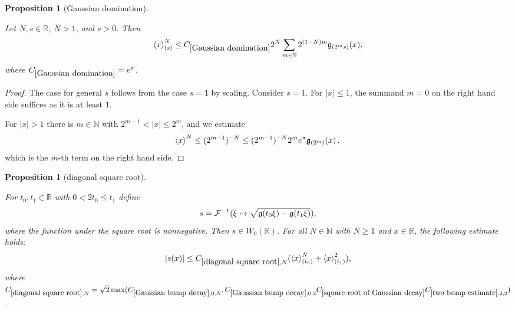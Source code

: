 \documentclass[12pt,reqno]{amsart}
\theoremstyle{plain}
\newtheorem{proposition}[theorem]{Proposition}
\numberwithin{equation}{section}
\theoremstyle{remark}
\newcommand{\uses}[1]{}
\newcommand{\usesdefs}[1]{}
\newcommand{\leanok}{}
\newcommand{\lean}[1]{}
\newcommand{\R}{{\mathbb R}}
\newcommand{\N}{{\mathbb N}}
\begin{document}
\begin{proposition}[Gaussian domination]\label{Gaussian domination}\uses{}\usesdefs{gaussian,bracket bump}
\lean{Auto.gaussianDomination}
\leanok
    Let
    $N,s\in\R$, $N>1$, and $s>0$. Then
\begin{equation}\label{auto:bracket-Gaussian-domination}
    \left< x\right>^{N}_{(s)}  \le C_{\ref{Gaussian domination}} 2^N   \sum_{m\in {\N}}  2^{(1-N)m} \g_{(2^ms)}(x),
\end{equation}
where $C_{\ref{Gaussian domination}}=e^\pi$.
\end{proposition}
 \begin{proof}
     The case for general $s$ follows from the case $s=1$ by scaling.  Consider $s=1$. For $|x|\le 1$, the summand $m=0$ on the right hand side suffices as it is at least $1$.

     For $|x|>1$ there is $m\in \N$ with $2^{m-1}<|x|\le 2^{m}$, and we estimate
     \begin{equation}
          \left< x\right>^{N}\le (2^{m-1})^{-N} \le (2^{m-1})^{-N} 2^me^\pi \mathfrak{g}_{(2^m)}(x)\, . \,
     \end{equation}
     which is the $m$-th term on the right hand side.
 \end{proof}


\begin{proposition}[diagonal square root]\label{diagonal square root}\uses{square root of Gaussian decay,Gaussian bump decay,two bump estimate}\usesdefs{gaussian,bracket bump,auto:Wiener-space-definition}
\lean{Auto.diagonalSquareRoot,Auto.diagonalSquareRoot_bound,Auto.diagonalSquareRoot_memW0}
\leanok
For $t_0,t_1\in\R$ with $0<2t_0\le t_1$ define
\begin{equation}\label{auto:diagonal-square-root-definition} s = \mathcal{F}^{-1}(\xi\mapsto \sqrt{\mathfrak{g}(t_0 \xi)- \mathfrak{g}(t_1 \xi)}), \end{equation}
where the function under the square root is nonnegative. Then
$s\in W_0(\R)$.
For all $N\in \mathbb N$ with $N\geq 1$ and $x\in \R$, the following estimate holds:
\begin{equation}\label{E:s-estimate}
    |s(x)|\le  C_{\ref{diagonal square root},N} ( \left<x\right>^N_{(t_0)}+ \left<x\right>^2_{(t_1)}),
\end{equation}
where
$C_{\ref{diagonal square root},N}=\sqrt{2}\max(C_{\ref{Gaussian bump decay},0,N}, C_{\ref{Gaussian bump decay},0,2}C_{\ref{square root of Gaussian decay}}C_{\ref{two bump estimate},2,2})$.

\end{proposition}
\end{document}
